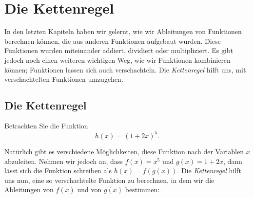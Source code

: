 \chapter{Die Kettenregel}

In den letzten Kapiteln haben wir gelernt, wie wir Ableitungen von Funktionen berechnen können, die aus anderen Funktionen aufgebaut wurden. Diese Funktionen wurden miteinander addiert, dividiert oder multipliziert. Es gibt jedoch noch einen weiteren wichtigen Weg, wie wir Funktionen kombinieren können; Funktionen lassen sich auch verschachteln. Die \textit{Kettenregel} hilft uns, mit verschachtelten Funktionen umzugehen.

\section{Die Kettenregel}


Betrachten Sie die Funktion
\[
h(x) = (1+2x)^5.
\] 

Natürlich gibt es verschiedene Möglichkeiten, diese Funktion nach der Variablen $x$ abzuleiten. Nehmen wir jedoch an, dass $f(x) = x^5$ und $g(x) = 1+2x$, dann lässt sich die Funktion schreiben als $h(x) =f(g(x))$. Die \textit{Kettenregel} hilft uns nun, eine so verschachtelte Funktion zu berechnen, in dem wir die Ableitungen von $f(x)$ und von $g(x)$ bestimmen:

